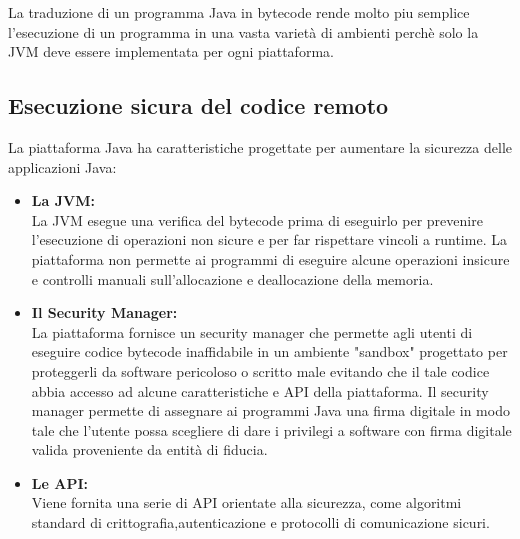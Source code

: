 La traduzione di un programma Java in bytecode rende molto piu semplice l'esecuzione di un programma in una vasta variet\`a di ambienti perch\`e solo la JVM deve essere implementata per ogni piattaforma.
\subsection*{Esecuzione sicura del codice remoto}
La piattaforma Java ha caratteristiche progettate per aumentare la sicurezza delle applicazioni Java:
\begin{itemize}
\item \textbf{La JVM:}\\
La JVM esegue una verifica del bytecode prima di eseguirlo per prevenire l'esecuzione di operazioni non sicure e per far rispettare vincoli a runtime. La piattaforma non permette ai programmi di eseguire alcune operazioni insicure e controlli manuali sull'allocazione e deallocazione della memoria.
\item \textbf{Il Security Manager:}\\
La piattaforma fornisce un security manager che permette agli utenti di eseguire codice bytecode inaffidabile in un ambiente "sandbox" progettato per proteggerli da software pericoloso o scritto male evitando che il tale codice abbia accesso ad alcune caratteristiche e API della piattaforma.
Il security manager permette di assegnare ai programmi Java una firma digitale in modo tale che l'utente possa scegliere di dare i privilegi a software con firma digitale valida proveniente da entità di fiducia.
\item \textbf{Le API:}\\
Viene fornita una serie di API orientate alla sicurezza, come algoritmi standard di crittografia,autenticazione e protocolli di comunicazione sicuri.
\end{itemize}
